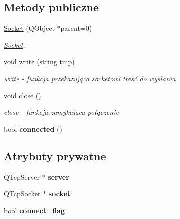 \subsection*{Metody publiczne}
\begin{DoxyCompactItemize}
\item 
\hyperlink{class_socket_ad56a75db4ac49694f2f511d7a8d98de6}{Socket} (Q\+Object $\ast$parent=0)
\begin{DoxyCompactList}\small\item\em \hyperlink{class_socket}{Socket}. \end{DoxyCompactList}\item 
void \hyperlink{class_socket_ac96341e53a5c97ed71dd4cb02e6f744d}{write} (string tmp)
\begin{DoxyCompactList}\small\item\em write -\/ funkcja przekazująca socketowi treść do wysłania \end{DoxyCompactList}\item 
void \hyperlink{class_socket_a75ee749264ccbcfc4dfbf5442e55dcb8}{close} ()\hypertarget{class_socket_a75ee749264ccbcfc4dfbf5442e55dcb8}{}\label{class_socket_a75ee749264ccbcfc4dfbf5442e55dcb8}

\begin{DoxyCompactList}\small\item\em close -\/ funkcja zamykająca połączenie \end{DoxyCompactList}\item 
bool {\bfseries connected} ()\hypertarget{class_socket_a98a0ab5316c4670de5349b44cc2d32b5}{}\label{class_socket_a98a0ab5316c4670de5349b44cc2d32b5}

\end{DoxyCompactItemize}
\subsection*{Atrybuty prywatne}
\begin{DoxyCompactItemize}
\item 
Q\+Tcp\+Server $\ast$ {\bfseries server}\hypertarget{class_socket_a298c271555c928af0828ce847551091c}{}\label{class_socket_a298c271555c928af0828ce847551091c}

\item 
Q\+Tcp\+Socket $\ast$ {\bfseries socket}\hypertarget{class_socket_a3fa6b86a9e07d4f5e641969a4dd82d13}{}\label{class_socket_a3fa6b86a9e07d4f5e641969a4dd82d13}

\item 
bool {\bfseries connect\+\_\+flag}\hypertarget{class_socket_a93a816c7a3bb5af9a212e0a063a3ef05}{}\label{class_socket_a93a816c7a3bb5af9a212e0a063a3ef05}

\end{DoxyCompactItemize}


